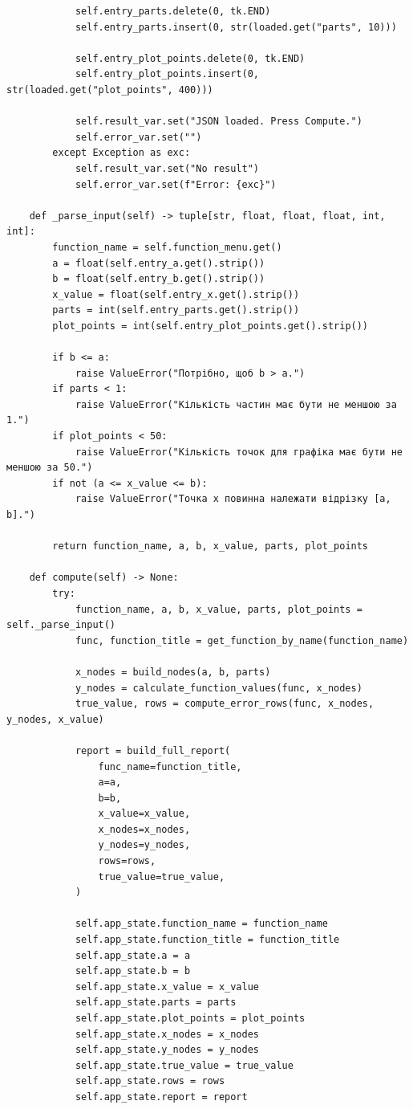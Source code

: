 \documentclass[12pt,a4paper]{article}
\begin{document}
\begin{verbatim}
            self.entry_parts.delete(0, tk.END)
            self.entry_parts.insert(0, str(loaded.get("parts", 10)))

            self.entry_plot_points.delete(0, tk.END)
            self.entry_plot_points.insert(0, str(loaded.get("plot_points", 400)))

            self.result_var.set("JSON loaded. Press Compute.")
            self.error_var.set("")
        except Exception as exc:
            self.result_var.set("No result")
            self.error_var.set(f"Error: {exc}")

    def _parse_input(self) -> tuple[str, float, float, float, int, int]:
        function_name = self.function_menu.get()
        a = float(self.entry_a.get().strip())
        b = float(self.entry_b.get().strip())
        x_value = float(self.entry_x.get().strip())
        parts = int(self.entry_parts.get().strip())
        plot_points = int(self.entry_plot_points.get().strip())

        if b <= a:
            raise ValueError("Потрібно, щоб b > a.")
        if parts < 1:
            raise ValueError("Кількість частин має бути не меншою за 1.")
        if plot_points < 50:
            raise ValueError("Кількість точок для графіка має бути не меншою за 50.")
        if not (a <= x_value <= b):
            raise ValueError("Точка x повинна належати відрізку [a, b].")

        return function_name, a, b, x_value, parts, plot_points

    def compute(self) -> None:
        try:
            function_name, a, b, x_value, parts, plot_points = self._parse_input()
            func, function_title = get_function_by_name(function_name)

            x_nodes = build_nodes(a, b, parts)
            y_nodes = calculate_function_values(func, x_nodes)
            true_value, rows = compute_error_rows(func, x_nodes, y_nodes, x_value)

            report = build_full_report(
                func_name=function_title,
                a=a,
                b=b,
                x_value=x_value,
                x_nodes=x_nodes,
                y_nodes=y_nodes,
                rows=rows,
                true_value=true_value,
            )

            self.app_state.function_name = function_name
            self.app_state.function_title = function_title
            self.app_state.a = a
            self.app_state.b = b
            self.app_state.x_value = x_value
            self.app_state.parts = parts
            self.app_state.plot_points = plot_points
            self.app_state.x_nodes = x_nodes
            self.app_state.y_nodes = y_nodes
            self.app_state.true_value = true_value
            self.app_state.rows = rows
            self.app_state.report = report


\end{verbatim}
\end{document}
